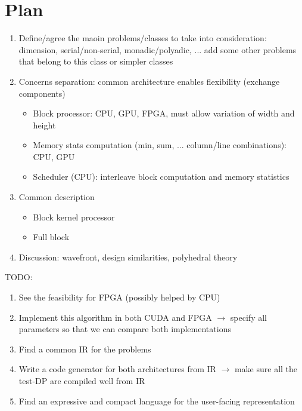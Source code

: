 \documentclass[11pt]{article}
\def\ul{\begin{itemize}}
\def\ule{\end{itemize}}
\def\ol{\begin{enumerate}}
\def\ole{\end{enumerate}}
\begin{document}
\newpage
\section{Plan} \ol
\item Define/agree the maoin problems/classes to take into consideration: dimension, serial/non-serial, monadic/polyadic, ... add some other problems that belong to this class or simpler classes
\item Concerns separation: common architecture enables flexibility (exchange components) \ul
	\item Block processor: CPU, GPU, FPGA, must allow variation of width and height
	\item Memory stats computation (min, sum, ... column/line combinations): CPU, GPU
	\item Scheduler (CPU): interleave block computation and memory statistics
	\ule
\item Common description \ul
	\item Block kernel processor
	\item Full block
	\ule
\item Discussion: wavefront, design similarities, polyhedral theory
\ole

TODO:\ol
\item See the feasibility for FPGA (possibly helped by CPU)
\item Implement this algorithm in both CUDA and FPGA $\to$ specify all parameters so that we can compare both implementations
\item Find a common IR for the problems
\item Write a code generator for both architectures from IR $\to$ make sure all the test-DP are compiled well from IR
\item Find an expressive and compact language for the user-facing representation
\ole


\end{document}
